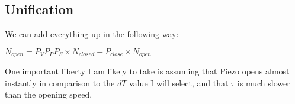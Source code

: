\documentclass[12pt]{amsart}
\begin{document}
\subsection{Unification} We can add everything up in the following way: 

\bigskip

\begin{center}

$N_{open} = P_VP_PP_S \times N_{closed} - P_{close}\times N_{open}$

\end{center}

\bigskip

One important liberty I am likely to take is assuming that Piezo opens almost instantly in comparison to the $dT$ value I will select, and that $\tau$ is much slower than the opening speed.
\end{document}
